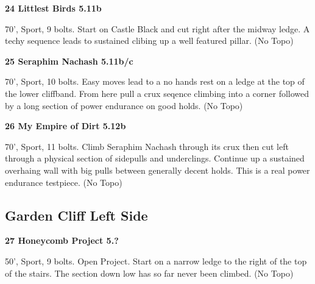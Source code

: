 \begin{multicols}{2}
\needspace{1.5cm}
\label{rt:Littlest Birds}
\colorbox{RoyalBlue!20}{
\parbox{0.95\linewidth}{
\textbf{
24 Littlest Birds 5.11b  
}}}

\begin{adjustwidth}{0.5cm}{}			
70', Sport, 9 bolts. Start on Castle Black and cut right after the midway ledge. A techy sequence leads to sustained clibing up a well featured pillar. (No Topo)
\end{adjustwidth}



\needspace{1.5cm}
\label{rt:Seraphim Nachash}
\colorbox{RoyalBlue!20}{
\parbox{0.95\linewidth}{
\textbf{
25 Seraphim Nachash 5.11b/c  
}}}

\begin{adjustwidth}{0.5cm}{}			
70', Sport, 10 bolts. Easy moves lead to a no hands rest on a ledge at the top of the lower cliffband. From here pull a crux seqence climbing into a corner followed by a long section of power endurance on good holds. (No Topo)
\end{adjustwidth}



\needspace{1.5cm}
\label{rt:My Empire of Dirt}
\colorbox{Goldenrod!50}{
\parbox{0.95\linewidth}{
\textbf{
26 My Empire of Dirt 5.12b  
}}}

\begin{adjustwidth}{0.5cm}{}			
70', Sport, 11 bolts. Climb Seraphim Nachash through its crux then cut left through a physical section of sidepulls and underclings. Continue up a sustained overhaing wall with big pulls between generally decent holds. This is a real power endurance testpiece. (No Topo)
\end{adjustwidth}




\needspace{1.5cm}
\subsection*{Garden Cliff Left Side}\label{bf:Garden Cliff Left Side}
	


\needspace{1.5cm}
\label{rt:Honeycomb Project}
\colorbox{black!20}{
\parbox{0.95\linewidth}{
\textbf{
27 Honeycomb Project 5.?  
}}}

\begin{adjustwidth}{0.5cm}{}			
50', Sport, 9 bolts. Open Project. Start on a narrow ledge to the right of the top of the stairs. The section down low has so far never been climbed. (No Topo)
\end{adjustwidth}


\end{multicols}

